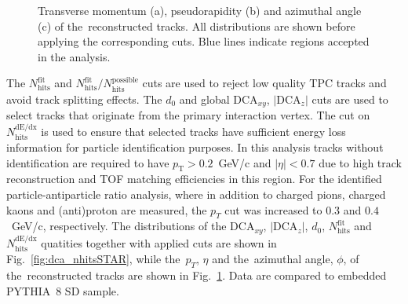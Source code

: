 \begin{figure}[h!]
\begin{subfigure}{.45\textwidth}
		\caption{}
	\end{subfigure}
	\begin{minipage}{.45\textwidth}
		
		
		\caption{Transverse momentum (a), pseudorapidity (b) and azimuthal angle (c) of the~reconstructed tracks. All distributions are shown before applying  the corresponding cuts. Blue lines indicate regions accepted in the analysis.}
		\label{fig:ptEtaPhiSTAR}
	\end{minipage}
\end{figure}


The $N_{\textrm{hits}}^{\textrm{fit}}$ and $N_{\textrm{hits}}^{\textrm{fit}}/N_{\textrm{hits}}^{\textrm{possible}}$ cuts are used to reject low quality TPC tracks and avoid track splitting effects. The $d_0$ and global $\textrm{DCA}_{xy}$,  $|\textrm{DCA}_{z}|$ cuts are used to select tracks that originate from the primary interaction vertex. The cut on $N_{\textrm{hits}}^{\textrm{dE/dx}}$ is used to ensure that selected tracks have sufficient energy loss information
for particle identification purposes. In this analysis tracks without identification are required to have $p_\textrm{T} > 0.2$~GeV/c and $|\eta| < 0.7$ due to high track reconstruction and TOF matching efficiencies in this region. For the identified particle-antiparticle ratio analysis, where in addition to charged pions, charged kaons and (anti)proton  are measured, the $p_T$ cut was increased  to $0.3$ and $0.4$~GeV/c, respectively. 
The distributions of the $\textrm{DCA}_{xy}$, $|\textrm{DCA}_{z}|$, $d_0$, $N_{\textrm{hits}}^{\textrm{fit}}$ and $N_{\textrm{hits}}^{\textrm{dE/dx}}$ quatities together with applied cuts are shown in Fig.~\ref{fig:dca_nhitsSTAR}, while the~$p_T$, $\eta$ and  the~azimuthal angle, $\phi$, of the~reconstructed tracks are shown in Fig.~\ref{fig:ptEtaPhiSTAR}. Data are compared to embedded PYTHIA~8 SD sample.



